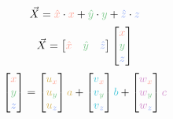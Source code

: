 \documentclass[preview]{standalone}
\begin{document}
$$\vec{X} = \textcolor[HTML]{fea294}{\hat{x}}\cdot \textcolor[HTML]{fea294}{x} + \textcolor[HTML]{81cb8f}{\hat{y}}\cdot \textcolor[HTML]{81cb8f}{y} + \textcolor[HTML]{91abf6}{\hat{z}}\cdot \textcolor[HTML]{91abf6}{z}$$
$$\vec{X} = \begin{bmatrix}\textcolor[HTML]{fea294}{\hat{x}}&\textcolor[HTML]{81cb8f}{\hat{y}}&\textcolor[HTML]{91abf6}{\hat{z}}\end{bmatrix}\begin{bmatrix}\textcolor[HTML]{fea294}{x}\\\textcolor[HTML]{81cb8f}{y}\\\textcolor[HTML]{91abf6}{z}\end{bmatrix}$$
$$\begin{bmatrix}\textcolor[HTML]{fea294}{x}\\\textcolor[HTML]{81cb8f}{y}\\\textcolor[HTML]{91abf6}{z}\end{bmatrix} =
\begin{bmatrix}\textcolor[HTML]{d7b760}{u}_{\textcolor[HTML]{fea294}{x}}\\\textcolor[HTML]{d7b760}{u}_{\textcolor[HTML]{81cb8f}{y}}\\\textcolor[HTML]{d7b760}{u}_{\textcolor[HTML]{91abf6}{z}}\end{bmatrix}\textcolor[HTML]{d7b760}{a} +
\begin{bmatrix}\textcolor[HTML]{46c6d9}{v}_{\textcolor[HTML]{fea294}{x}}\\\textcolor[HTML]{46c6d9}{v}_{\textcolor[HTML]{81cb8f}{y}}\\\textcolor[HTML]{46c6d9}{v}_{\textcolor[HTML]{91abf6}{z}}\end{bmatrix}\textcolor[HTML]{46c6d9}{b} +
\begin{bmatrix}\textcolor[HTML]{d290cd}{w}_{\textcolor[HTML]{fea294}{x}}\\\textcolor[HTML]{d290cd}{w}_{\textcolor[HTML]{81cb8f}{y}}\\\textcolor[HTML]{d290cd}{w}_{\textcolor[HTML]{91abf6}{z}}\end{bmatrix}\textcolor[HTML]{d290cd}{c}$$
\end{document}
